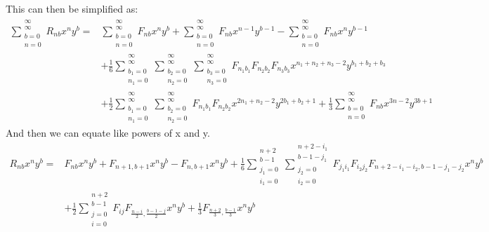 \documentclass{article}
\begin{document}
This can then be simplified as:
\begin{align}
\sum_{\substack{b=0\\n=0}}^{\substack{\infty\\ \infty}} R_{nb} x^ny^b= &
\sum_{\substack{b=0\\n=0}}^{\substack{\infty\\ \infty}} F_{nb} x^ny^b+
\sum_{\substack{b=0\\n=0}}^{\substack{\infty\\ \infty}} F_{nb} x^{n-1}y^{b-1}-
\sum_{\substack{b=0\\n=0}}^{\substack{\infty\\ \infty}} F_{nb} x^ny^{b-1} \nonumber \\
&+\frac{1}{6}\sum_{\substack{b_1=0\\n_1=0}}^{\substack{\infty\\ \infty}}\sum_{\substack{b_2=0\\n_2=0}}^{\substack{\infty\\ \infty}}\sum_{\substack{b_3=0\\n_3=0}}^{\substack{\infty\\ \infty}} F_{n_1b_1}F_{n_2b_2}F_{n_3b_3} x^{n_1+n_2+n_3-2}y^{b_1+b_2+b_3} \nonumber \\
&+\frac{1}{2}\sum_{\substack{b_1=0\\n_1=0}}^{\substack{\infty\\ \infty}}\sum_{\substack{b_2=0\\n_2=0}}^{\substack{\infty\\ \infty}}  F_{n_1b_1}F_{n_2b_2}x^{2n_1+n_2-2}y^{2b_1+b_2+1}+
\frac{1}{3}\sum_{\substack{b=0\\n=0}}^{\substack{\infty\\ \infty}} F_{nb} x^{3n-2}y^{3b+1}
\end{align}
And then we can equate like powers of x and y.
\begin{align}
 R_{nb} x^ny^b= & F_{nb} x^ny^b+ F_{n+1,b+1} x^ny^b- F_{n,b+1} x^ny^b 
+\frac{1}{6}\sum_{\substack{j_1=0\\i_1=0}}^{\substack{n+2\\ b-1}}\sum_{\substack{j_2=0\\i_2=0}}^{\substack{n+2-i_1\\ b-1-j_1}}F_{j_1i_1}F_{i_2j_2}F_{n+2-i_1-i_2,b-1-j_1-j_2} x^ny^b \nonumber \\
&+\frac{1}{2}\sum_{\substack{j=0\\i=0}}^{\substack{n+2\\ b-1}} F_{ij}F_{\frac{n-i}{2},\frac{b-1-j}{2}}x^ny^b+
\frac{1}{3} F_{\frac{n+2}{3},\frac{b-1}{3}} x^ny^b
\end{align}
\end{document}
